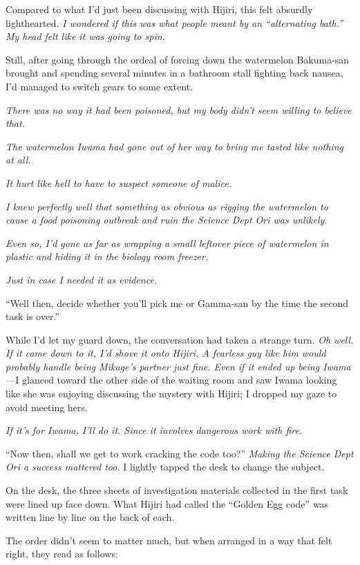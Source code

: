 \documentclass[
    a4paper,
    12pt,
    twoside,
    openany,
    UTF8,
    fontset=windows
]{ctexbook}
\begin{document}
Compared to what I'd just been discussing with Hijiri, this felt absurdly lighthearted. \textit{I wondered if this was what people meant by an ``alternating bath.'' My head felt like it was going to spin.}

Still, after going through the ordeal of forcing down the watermelon Bakuma-san brought and spending several minutes in a bathroom stall fighting back nausea, I'd managed to switch gears to some extent.

\textit{There was no way it had been poisoned, but my body didn't seem willing to believe that.}

\textit{The watermelon Iwama had gone out of her way to bring me tasted like nothing at all.}

\textit{It hurt like hell to have to suspect someone of malice.}

\textit{I knew perfectly well that something as obvious as rigging the watermelon to cause a food poisoning outbreak and ruin the Science Dept Ori was unlikely.}

\textit{Even so, I'd gone as far as wrapping a small leftover piece of watermelon in plastic and hiding it in the biology room freezer.}

\textit{Just in case I needed it as evidence.}

``Well then, decide whether you'll pick me or Gamma-san by the time the second task is over.''

While I'd let my guard down, the conversation had taken a strange turn. \textit{Oh well. If it came down to it, I'd shove it onto Hijiri. A fearless guy like him would probably handle being Mikage's partner just fine. Even if it ended up being Iwama---}I glanced toward the other side of the waiting room and saw Iwama looking like she was enjoying discussing the mystery with Hijiri; I dropped my gaze to avoid meeting hers.

\textit{If it's for Iwama, I'll do it. Since it involves dangerous work with fire.}

``Now then, shall we get to work cracking the code too?'' \textit{Making the Science Dept Ori a success mattered too.} I lightly tapped the desk to change the subject.

On the desk, the three sheets of investigation materials collected in the first task were lined up face down. What Hijiri had called the ``Golden Egg code'' was written line by line on the back of each.

The order didn't seem to matter much, but when arranged in a way that felt right, they read as follows:
\end{document}
